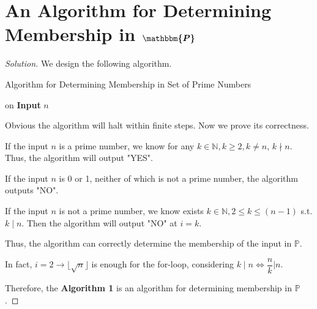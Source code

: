 \documentclass{article}
\newenvironment{solution}{\begin{proof}[\noindent\it Solution]}{\end{proof}}
\begin{document}
\section{An Algorithm for Determining Membership in $\boldsymbol{\mathbbm{P}}$}
\vspace{1em}
\begin{solution}
    We design the following algorithm.

    \vspace{-0.5em}
    \begin{algorithm}
        \caption{Algorithm for Determining Membership in Set of Prime Numbers}
        
	    {
	    on \textbf{Input} $n$\;
	    {
	    }
	    }
    \end{algorithm}
    
    \vspace{-0.9em} \hspace{1.3em}
    Obvious the algorithm will halt within finite steps. Now we prove its correctness.
    
    \hspace{1.3em}
    If the input $n$ is a prime number, we know for any $k\in\mathbb{N}, k\geq 2, k\neq n$, $k\nmid n.$ Thus, the algorithm will output "YES". 
    
    \hspace{1.3em}
    If the input $n$ is 0 or 1, neither of which is not a prime number, the algorithm outputs "NO".
    
    \hspace{1.3em}
    If the input $n$ is not a prime number, we know exists $k\in\mathbb{N}, 2\le k\le (n-1)$ s.t. $k\mid n$. Then the algorithm will output "NO" at $i=k$.
    
    \hspace{1.3em}
    Thus, the algorithm can correctly determine the membership of the input in $\mathbb{P}$.
    
    \hspace{1.3em}
    In fact, $i=2\to\lfloor\sqrt{n}\rfloor$ is enough for the for-loop, considering $k\mid n\Leftrightarrow \dfrac{n}{k}\Big| n.$
    
    \hspace{1.3em}
    Therefore, the \textbf{Algorithm 1} is an algorithm for determining membership in $\mathbb{P}$.
\end{solution}
\end{document}
